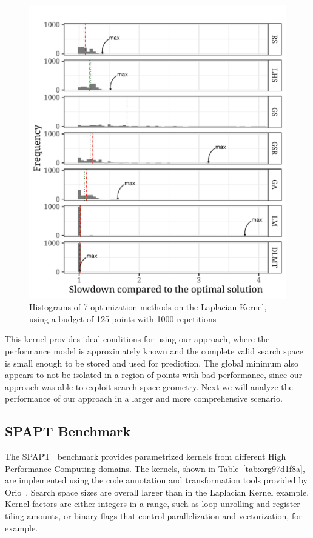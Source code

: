 \documentclass[conference]{IEEEtran}
\begin{document}
\begin{center}
\begin{figure}[ht]
\centering
\includegraphics[width=.9\columnwidth]{./img/comparison_histogram.pdf}
\caption{\label{fig:org8226696}
Histograms of 7 optimization methods on the Laplacian Kernel, using a budget of 125 points with 1000 repetitions}
\end{figure}
\end{center}

This kernel provides ideal conditions for using our approach, where the
performance model is approximately known and the complete valid search space is
small enough to be stored and used for prediction. The global minimum also
appears to not be isolated in a region of points with bad performance, since our
approach was able to exploit search space geometry. Next we will analyze the
performance of our approach in a larger and more comprehensive scenario.
\subsection{SPAPT Benchmark}
\label{sec:orga17ad47}
The SPAPT~\cite{balaprakash2012spapt} benchmark provides parametrized
kernels from different High Performance Computing domains. The kernels, shown in
Table~\ref{tab:org97d1f8a}, are implemented using the code annotation and
transformation tools provided by Orio~\cite{hartono2009annotation}. Search
space sizes are overall larger than in the Laplacian Kernel example. Kernel factors
are either integers in a range, such as loop unrolling and register tiling amounts,
or binary flags that control parallelization and vectorization, for example.
\end{document}
